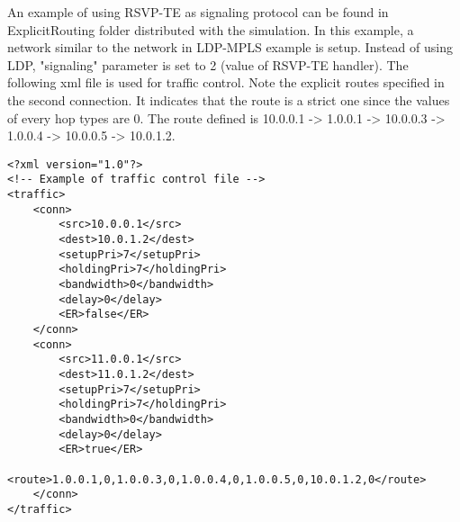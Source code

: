 An example of using RSVP-TE as signaling protocol can be found in
ExplicitRouting folder distributed with the simulation. In this
example, a network similar to the network in LDP-MPLS example is
setup. Instead of using LDP, "signaling" parameter is set to 2 (value
of RSVP-TE handler). The following xml file is used for traffic
control. Note the explicit routes specified in the second connection.
It indicates that the route is a strict one since the values of every
hop types are 0. The route defined is 10.0.0.1 -> 1.0.0.1 ->
10.0.0.3 -> 1.0.0.4 -> 10.0.0.5 -> 10.0.1.2.

\begin{verbatim}
<?xml version="1.0"?>
<!-- Example of traffic control file -->
<traffic>
    <conn>
        <src>10.0.0.1</src>
        <dest>10.0.1.2</dest>
        <setupPri>7</setupPri>
        <holdingPri>7</holdingPri>
        <bandwidth>0</bandwidth>
        <delay>0</delay>
        <ER>false</ER>
    </conn>
    <conn>
        <src>11.0.0.1</src>
        <dest>11.0.1.2</dest>
        <setupPri>7</setupPri>
        <holdingPri>7</holdingPri>
        <bandwidth>0</bandwidth>
        <delay>0</delay>
        <ER>true</ER>
        <route>1.0.0.1,0,1.0.0.3,0,1.0.0.4,0,1.0.0.5,0,10.0.1.2,0</route>
    </conn>
</traffic>
\end{verbatim}



